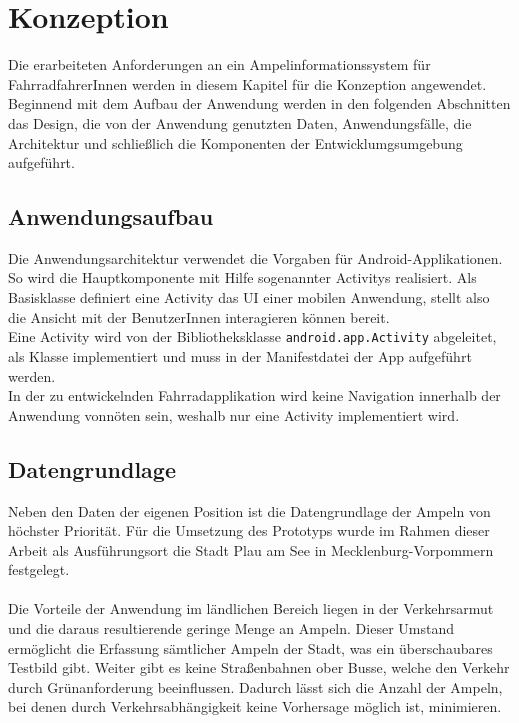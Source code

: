 \chapter{\label{chap:entwurf}Konzeption}
Die erarbeiteten Anforderungen an ein Ampelinformationssystem für FahrradfahrerInnen werden in diesem Kapitel für die Konzeption angewendet. Beginnend mit dem Aufbau der Anwendung werden in den folgenden Abschnitten das Design, die von der Anwendung genutzten Daten, Anwendungsfälle, die Architektur und schließlich die Komponenten der Entwicklumgsumgebung aufgeführt. 
\section{Anwendungsaufbau}
Die Anwendungsarchitektur verwendet die Vorgaben für Android-Applikationen. So wird die Hauptkomponente mit Hilfe sogenannter \glspl{Activity} realisiert. Als Basisklasse definiert eine \gls{Activity} das \gls{UI} einer mobilen Anwendung, stellt also die Ansicht mit der BenutzerInnen interagieren können bereit.\\
Eine \gls{Activity} wird von der Bibliotheksklasse \texttt{android.app.Activity} abgeleitet, als Klasse implementiert und muss in der Manifestdatei der \gls{App} aufgeführt werden. \cite{android_activity} \\
In der zu entwickelnden Fahrradapplikation wird keine Navigation innerhalb der Anwendung vonnöten sein, weshalb nur eine \gls{Activity} implementiert wird.
%
%
\section{Datengrundlage}
Neben den Daten der eigenen Position ist die Datengrundlage der Ampeln von höchster Priorität. Für die Umsetzung des Prototyps wurde im Rahmen dieser Arbeit als Ausführungsort die Stadt Plau am See in Mecklenburg-Vorpommern festgelegt.\\\\ 
Die Vorteile der Anwendung im ländlichen Bereich liegen in der Verkehrsarmut und die daraus resultierende geringe Menge an Ampeln. Dieser Umstand ermöglicht die Erfassung sämtlicher Ampeln der Stadt, was ein überschaubares Testbild gibt. 
Weiter gibt es keine Straßenbahnen ober Busse, welche den Verkehr durch Grünanforderung beeinflussen. Dadurch lässt sich die Anzahl der Ampeln, bei denen durch Verkehrsabhängigkeit keine Vorhersage möglich ist, minimieren. 

%
%
\clearpage

